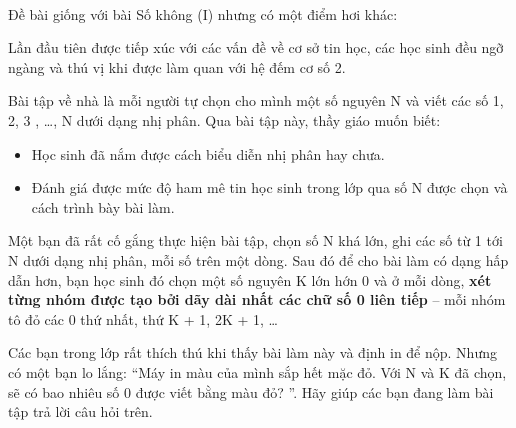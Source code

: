  

Đề bài giống với bài Số không (I) nhưng có một điểm hơi khác:

Lần đầu tiên được tiếp xúc với các vấn đề về cơ sở tin học, các học sinh đều ngỡ ngàng và thú vị khi được làm quan với hệ đếm cơ số 2.

Bài tập về nhà là mỗi người tự chọn cho mình một số nguyên N và viết các số 1, 2, 3 , …, N dưới dạng nhị phân. Qua bài tập này, thầy giáo muốn biết:
\begin{itemize}
	\item Học sinh đã nắm được cách biểu diễn nhị phân hay chưa.
	\item Đánh giá được mức độ ham mê tin học sinh trong lớp qua số N được chọn và cách trình bày bài làm.
\end{itemize}

Một bạn đã rất cố gắng thực hiện bài tập, chọn số N khá lớn, ghi các số từ 1 tới N dưới dạng nhị phân, mỗi số trên một dòng. Sau đó để cho bài làm có dạng hấp dẫn hơn, bạn học sinh đó chọn một số nguyên K lớn hớn 0 và ở mỗi dòng, \textbf{xét từng nhóm được tạo bởi dãy dài nhất các chữ số 0 liên tiếp} – mỗi nhóm tô đỏ các 0 thứ nhất, thứ K + 1, 2K + 1, …

Các bạn trong lớp rất thích thú khi thấy bài làm này và định in để nộp. Nhưng có một bạn lo lắng: “Máy in màu của mình sắp hết mặc đỏ. Với N và K đã chọn, sẽ có bao nhiêu số 0 được viết bằng màu đỏ? ”. Hãy giúp các bạn đang làm bài tập trả lời câu hỏi trên.

\